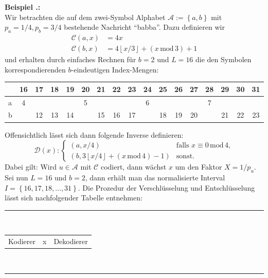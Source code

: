 \documentclass[a4paper,12pt]{article}
\newcommand{\A}{\mathcal A}
\newcommand{\C}{\mathcal C}
\newcommand{\D}{\mathcal D}
\newcounter{Beispiel}
\newenvironment{Beispiel}{
\medskip
        
        \setlength{\parindent}{0pt}
        \addtocounter{Beispiel}{1}
        \textbf{\textsf{Beispiel \thesubsection.\theBeispiel}:}\\}{
        \nopagebreak
        \vspace{-1.0ex}
        \bigskip
        
}
\begin{document}
\begin{Beispiel}
Wir betrachten die auf dem zwei-Symbol Alphabet  $\A :=\left\{a, b\right\}$    mit $p_a=1 /4, p_b = 3/4$ bestehende Nachricht "`babba"'. Dazu definieren wir
\begin{align*}
\C(a,x)&=4 x
\\
\C(b,x) &= 4 \left\lfloor x/3 \right\rfloor + \left(x\,\text{mod}\, 3\right)+ 1
\end{align*}
und erhalten durch einfaches Rechnen für $b=2$ und $L=16$ die den Symbolen korrespondierenden $b$-eindeutigen Index-Mengen:
\par
\vspace{0.5cm}
\begin{center}
 \begin{tabular}{l|c|c|c|c|c|c|c|c|c|c|c|c|c|c|c|c}
 & 16 & 17 & 18 & 19 & 20 & 21 & 22 & 23 & 24 & 25 & 26 & 27 & 28 & 29 & 30 &31\\
\hline
a	& 4 & & & & 5	& &  & & 6 & &  & & 7 & & &	\\
\hline
b	&  & 12 & 13 & 14 & 	& 15 & 16 & 17 &  & 18 & 19 & 20 &  & 21 & 22 & 23 	\\
\end{tabular}
\end{center}
\vspace{0.5cm}
Offensichtlich lässt sich dann folgende Inverse definieren:
$$
\D(x):
               \begin{cases}
                 \left(a,x / 4\right)          & \text{falls}\,\, x \equiv 0 \,\text{mod}\, 4,\\
                   \left(b,3 \left\lfloor x/4\right\rfloor + \left(x\,\text{mod}\, 4\right)- 1 \right) & \text{sonst}.
                \end{cases}
$$
Dabei gilt: Wird $u\in\A$ mit $\C$ codiert, dann wächst $x$ um den Faktor $X = 1 / p_u$. Sei nun $L=16$ und $b=2$, dann erhält man das normalisierte Interval $I=\left\{16, 17, 18,\ldots,31\right\}$.
Die Prozedur der Verschlüsselung und Entschlüsselung lässt sich nachfolgender Tabelle entnehmen:
\newpage
\begin{center}
{\color{gray!50!blue}\rule{8cm}{0.5mm}}
\\
\begin{tabular}{c c c}
Kodierer & x & Dekodierer
\end{tabular}
\vspace{-0.2cm}
\\
{\color{gray!50!blue}\rule{8cm}{0.1mm}}
\\
\begin{tabular}{c c c}

\end{tabular}
\end{center}
\end{Beispiel}
\end{document}
